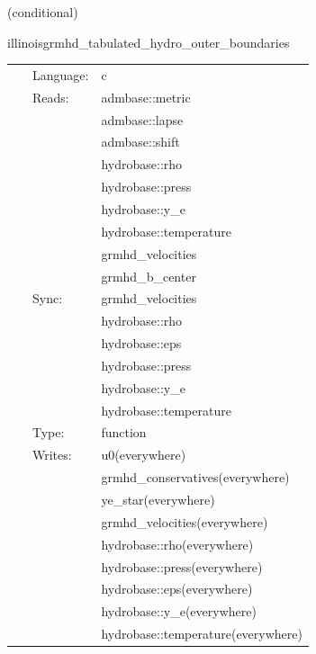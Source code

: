    (conditional) 

\hspace{5mm} illinoisgrmhd\_tabulated\_hydro\_outer\_boundaries 

\hspace{5mm}{\it tabulated version of illinoisgrmhd\_outer\_boundaries } 


\hspace{5mm}

 \begin{tabular*}{160mm}{cll} 
~ & Language:  & c \\ 
~ & Reads:  & admbase::metric \\ 
~& ~ &admbase::lapse\\ 
~& ~ &admbase::shift\\ 
~& ~ &hydrobase::rho\\ 
~& ~ &hydrobase::press\\ 
~& ~ &hydrobase::y\_e\\ 
~& ~ &hydrobase::temperature\\ 
~& ~ &grmhd\_velocities\\ 
~& ~ &grmhd\_b\_center\\ 
~ & Sync:  & grmhd\_velocities \\ 
~& ~ &hydrobase::rho\\ 
~& ~ &hydrobase::eps\\ 
~& ~ &hydrobase::press\\ 
~& ~ &hydrobase::y\_e\\ 
~& ~ &hydrobase::temperature\\ 
~ & Type:  & function \\ 
~ & Writes:  & u0(everywhere) \\ 
~& ~ &grmhd\_conservatives(everywhere)\\ 
~& ~ &ye\_star(everywhere)\\ 
~& ~ &grmhd\_velocities(everywhere)\\ 
~& ~ &hydrobase::rho(everywhere)\\ 
~& ~ &hydrobase::press(everywhere)\\ 
~& ~ &hydrobase::eps(everywhere)\\ 
~& ~ &hydrobase::y\_e(everywhere)\\ 
~& ~ &hydrobase::temperature(everywhere)\\ 
\end{tabular*} 


\vspace{5mm}

